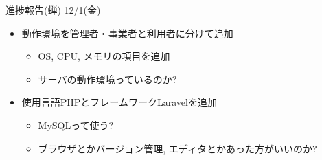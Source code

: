 \documentclass[dvipdfmx]{beamer}
\begin{document}
\begin{frame}{進捗報告(蝉) 12/1(金)} 
  \begin{itemize}
  \item 動作環境を管理者・事業者と利用者に分けて追加 \\
    \begin{itemize}
    \item OS, CPU, メモリの項目を追加
    \item サーバの動作環境っているのか?
    \end{itemize}
  \item 使用言語PHPとフレームワークLaravelを追加 \\
    \begin{itemize}
    \item MySQLって使う?
    \item ブラウザとかバージョン管理, エディタとかあった方がいいのか?
    \end{itemize}
  \end{itemize}
\end{frame}
\end{document}
